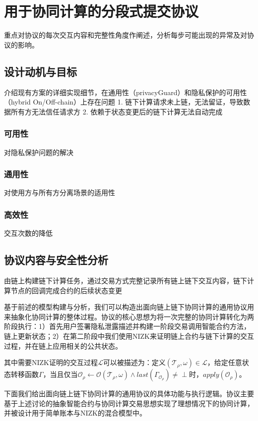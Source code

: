 \chapter{用于协同计算的分段式提交协议}
重点对协议的每次交互内容和完整性角度作阐述，分析每步可能出现的异常及对协议的影响。
\section{设计动机与目标}
介绍现有方案的详细实现细节，在通用性（privacyGuard）和隐私保护的可用性（hybrid On/Off-chain）上存在问题
1. 链下计算请求未上链，无法留证，导致数据所有方无法信任请求方
2. 依赖于状态变更后的链下计算无法自动完成
\subsection{可用性}
对隐私保护问题的解决

\subsection{通用性}
对使用方与所有方分离场景的适用性

\subsection{高效性}
交互次数的降低

\section{协议内容与安全性分析}
由链上构建链下计算任务，通过交易方式完整记录所有链上链下交互内容，链下计算节点的回调完成合约的后续状态变更

基于前述的模型构建与分析，我们可以构造出面向链上链下协同计算的通用协议用来抽象化协同计算的整体过程。协议的核心思想为将一次完整的协同计算转化为两阶段执行：1）首先用户签署隐私泄露描述并构建一阶段交易调用智能合约方法，链上更新状态；2）在第二阶段中我们使用NIZK来证明链上合约与链下计算的交互过程，并在链上应用相关的公共状态。

其中需要NIZK证明的交互过程$\mathcal{L}$可以被描述为：定义$(\mathcal{T}_\rho, \omega) \in \mathcal{L}$，给定任意状态转移函数$\Gamma$，当且仅当$\mathcal{O}_\rho \leftarrow \mathcal{O}(\mathcal{T}_\rho, \omega)\wedge last(\Gamma_{\mathcal{O}_\rho}) \neq \perp$时，$apply(\mathcal{O}_\rho)$。

下面我们给出面向链上链下协同计算的通用协议的具体功能与执行逻辑。协议主要基于上述讨论的抽象智能合约与协同计算交易思想实现了理想情况下的协同计算，并被设计用于简单账本与NIZK的混合模型中。


